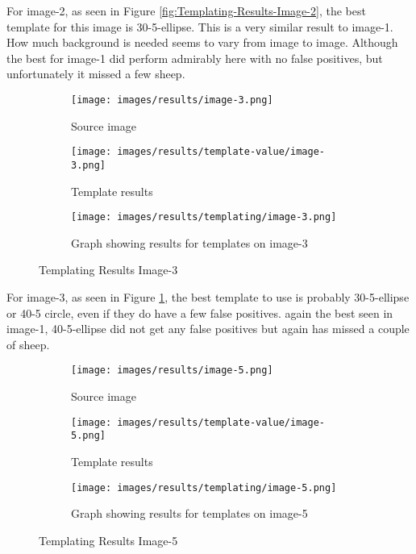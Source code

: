 For image-2, as seen in  Figure \ref{fig:Templating-Results-Image-2}, the best template for this image is 30-5-ellipse. This is a very similar result to image-1. How much background is needed seems to vary from image to image. Although the best for image-1 did perform admirably here with no false positives, but unfortunately it missed a few sheep.

\begin{figure}[H]
    \centering
    
    \begin{subfigure}{0.5\textwidth}
        \centering
        \texttt{[image: images/results/image-3.png]}
        \caption{Source image}
    \end{subfigure}%
    \begin{subfigure}{0.5\textwidth}
        \centering
        \texttt{[image: images/results/template-value/image-3.png]}
        \caption{Template results}
    \end{subfigure}
    \begin{subfigure}{\textwidth}
    \centering
        \texttt{[image: images/results/templating/image-3.png]}
        \caption{Graph showing results for templates on image-3}
    \end{subfigure}
    
    \caption{Templating Results Image-3}
    \label{fig:Templating-Results-Image-3}
\end{figure}

For image-3, as seen in  Figure \ref{fig:Templating-Results-Image-3}, the best template to use is probably 30-5-ellipse or 40-5 circle, even if they do have a few false positives. again the best seen in image-1, 40-5-ellipse did not get any false positives but again has missed a couple of sheep. 

\begin{figure}[H]
    \centering
    
    \begin{subfigure}{0.5\textwidth}
        \centering
        \texttt{[image: images/results/image-5.png]}
        \caption{Source image}
    \end{subfigure}%
    \begin{subfigure}{0.5\textwidth}
        \centering
        \texttt{[image: images/results/template-value/image-5.png]}
        \caption{Template results}
    \end{subfigure}
    \begin{subfigure}{\textwidth}
    \centering
        \texttt{[image: images/results/templating/image-5.png]}
        \caption{Graph showing results for templates on image-5}
    \end{subfigure}
    
    \caption{Templating Results Image-5}
    \label{fig:Templating-Results-Image-5}
\end{figure}

